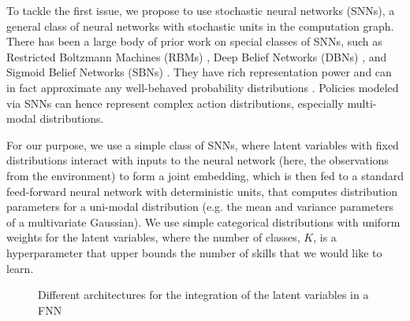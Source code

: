 \documentclass{article} %
\begin{document}
To tackle the first issue, we propose to use stochastic neural networks (SNNs), a general class of neural networks with stochastic units in the computation graph. There has been a large body of prior work on special classes of SNNs, such as Restricted Boltzmann Machines (RBMs) \citep{smolensky1986information, hinton2002training}, Deep Belief Networks (DBNs) \citep{hinton2006fast}, and Sigmoid Belief Networks (SBNs) \citep{neal1990learning, Tang2014_FSNN}. They have rich representation power and can in fact approximate any well-behaved probability distributions \citep{le2008representational, cho2013gaussian}. Policies modeled via SNNs can hence represent complex action distributions, especially multi-modal distributions.

For our purpose, we use a simple class of SNNs, where latent variables with fixed distributions interact with inputs to the neural network (here, the observations from the environment) to form a joint embedding, which is then fed to a standard feed-forward neural network with deterministic units, that computes distribution parameters for a uni-modal distribution (e.g. the mean and variance parameters of a multivariate Gaussian). We use simple categorical distributions with uniform weights for the latent variables, where the number of classes, $K$, is a hyperparameter that upper bounds the number of skills that we would like to learn.%
\begin{figure}[th]
	\centering
	\caption{Different architectures for the integration of the latent variables in a FNN}
	\label{fig:snn_architecture}
\end{figure}
\end{document}
